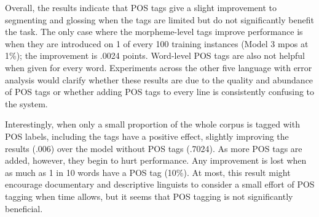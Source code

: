 Overall, the results indicate that POS tags give a slight improvement to segmenting and glossing when the tags are limited but do not significantly benefit the task. The only case where the morpheme-level tags improve performance is when they are introduced on 1 of every 100 training instances (Model 3 mpos at 1\%); the improvement is .0024 points. Word-level POS tags are also not helpful when given for every word. Experiments across the other five language with error analysis would clarify whether these results are due to the quality and abundance of POS tags or whether adding POS tags to every line is consistently confusing to the system. 

Interestingly, when only a small proportion of the whole corpus is tagged with POS labels, including the tags have a positive effect, slightly improving the results (.006) over the model without POS tags (.7024). As more POS tags are added, however, they begin to hurt performance. Any improvement is lost when as much as 1 in 10 words have a POS tag (10\%). At most, this result might encourage documentary and descriptive linguists to consider a small effort of POS tagging when time allows, but it seems that POS tagging is not significantly beneficial.
